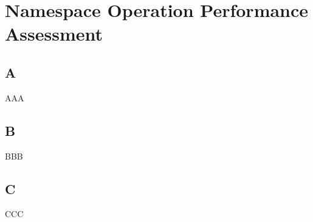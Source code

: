 
%
%
%


\chapter{Namespace Operation Performance Assessment}
\label{ch:Assessment}

%



\section{A}

AAA


\section{B}

BBB


\section{C}

CCC
